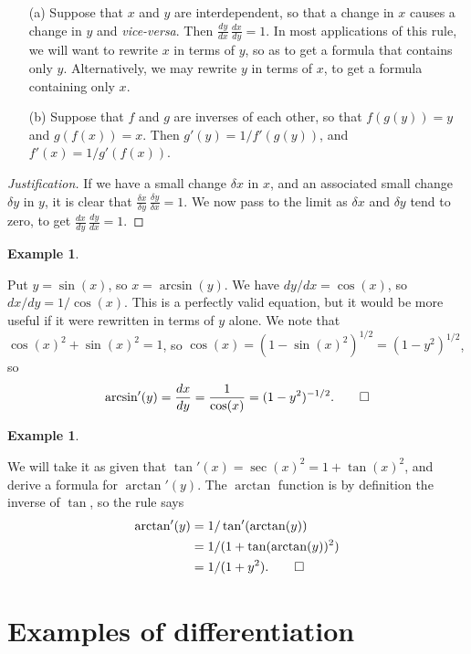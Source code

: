 \documentclass[a4paper]{book}
\newcommand{\dl}        {\delta}
\renewcommand{\:}{\colon}
\newcommand{\bilabel}[1]{\hypertarget{#1}{\label{#1}}}
\theoremstyle{definition}
\newtheorem{example}[theorem]{Example}
\begin{document}
\begin{itemize}
 \item[(a)] Suppose that $x$ and $y$ are interdependent, so that a
  change in $x$ causes a change in $y$ and \emph{vice-versa}.  Then 
  $\frac{dy}{dx}\,\frac{dx}{dy}=1$.  In most applications of this
  rule, we will want to rewrite $x$ in terms of $y$, so as to get a
  formula that contains only $y$.  Alternatively, we may rewrite $y$
  in terms of $x$, to get a formula containing only $x$.
 \item[(b)] Suppose that $f$ and $g$ are inverses of each other, so
  that $f(g(y))=y$ and $g(f(x))=x$.  Then $g'(y)=1/f'(g(y))$, and
  $f'(x)=1/g'(f(x))$. 
\end{itemize}
\begin{proof}[Justification]
 If we have a small change $\dl x$ in $x$, and an associated small
 change $\dl y$ in $y$, it is clear that
 $\frac{\dl x}{\dl y}\,\frac{\dl y}{\dl x}=1$.  We now pass to the
 limit as $\dl x$ and $\dl y$ tend to zero, to get
 $\frac{dx}{dy}\,\frac{dy}{dx}=1$. 
\end{proof}
\begin{example}\bilabel{eg-diff-arcsin}
 Put $y=\sin(x)$, so $x=\arcsin(y)$.  We have $dy/dx=\cos(x)$, so
 $dx/dy=1/\cos(x)$.  This is a perfectly valid equation, but it would
 be more useful if it were rewritten in terms of $y$ alone.  We note
 that $\cos(x)^2+\sin(x)^2=1$, so
 $\cos(x)=(1-\sin(x)^2)^{1/2}=(1-y^2)^{1/2}$, so 
 \[ \arcsin'(y) = \frac{dx}{dy} =
     \frac{1}{\cos(x)} = (1-y^2)^{-1/2}. \qed
 \] 
\end{example}
\begin{example}\bilabel{eg-diff-arctan}
 We will take it as given that $\tan'(x)=\sec(x)^2=1+\tan(x)^2$, and
 derive a formula for $\arctan'(y)$.  The $\arctan$ function is by
 definition the inverse of $\tan$, so the rule says
 \begin{align*}
  \arctan'(y) &= 1/\tan'(\arctan(y)) \\
              &= 1/(1 + \tan(\arctan(y))^2) \\
              &= 1/(1 + y^2). \qed
 \end{align*}
\end{example}

\section{Examples of differentiation}
\label{sec-diff-eg}
\end{document}
